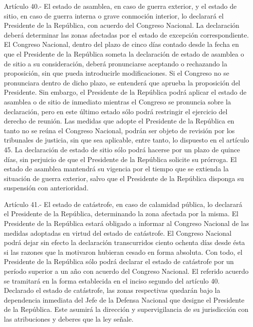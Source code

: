     Artículo 40.- El estado de asamblea, en caso de guerra exterior, y el estado de sitio, en caso de guerra  interna o grave conmoción interior, lo declarará el Presidente de la República, con acuerdo del Congreso Nacional. La declaración deberá determinar las zonas afectadas por el estado de excepción correspondiente.
    El Congreso Nacional, dentro del plazo de cinco días contado desde la fecha en que el Presidente de la República someta la declaración de estado de asamblea o de sitio a su consideración, deberá pronunciarse aceptando o rechazando la proposición, sin que pueda introducirle modificaciones. Si el Congreso no se pronunciara dentro de dicho plazo, se entenderá que aprueba la proposición del Presidente.
    Sin embargo, el Presidente de la República podrá aplicar el estado de asamblea o de sitio de inmediato mientras el Congreso se pronuncia sobre la declaración, pero en este último estado sólo podrá restringir el ejercicio del derecho de reunión. Las medidas que adopte el Presidente de la República en tanto no se reúna el Congreso Nacional, podrán ser objeto de revisión por los tribunales de justicia, sin que sea aplicable, entre tanto, lo dispuesto en el artículo 45.
    La declaración de estado de sitio sólo podrá hacerse por un plazo de quince días, sin perjuicio de que el Presidente de la República solicite su prórroga. El estado de asamblea mantendrá su vigencia por el tiempo que se extienda la situación de guerra exterior, salvo que el Presidente de la República disponga su suspensión con anterioridad.



    Artículo 41.- El estado de catástrofe, en caso de calamidad pública, lo declarará el Presidente de la República, determinando la zona afectada por la misma.
    El Presidente de la República estará obligado a informar al Congreso Nacional de las medidas adoptadas en virtud del estado de catástrofe. El Congreso Nacional podrá dejar sin efecto la declaración transcurridos ciento ochenta días desde ésta si las razones que la motivaron hubieran cesado en forma absoluta. Con todo, el Presidente de la República sólo podrá declarar el estado de catástrofe por un período superior a un año con acuerdo del Congreso Nacional. El referido acuerdo se tramitará en la forma establecida en el inciso segundo del artículo 40.
    Declarado el estado de catástrofe, las zonas respectivas quedarán bajo la dependencia inmediata del Jefe de la Defensa Nacional que designe el Presidente de la República. Este asumirá la dirección y supervigilancia de su jurisdicción con las atribuciones y deberes que la ley señale.



